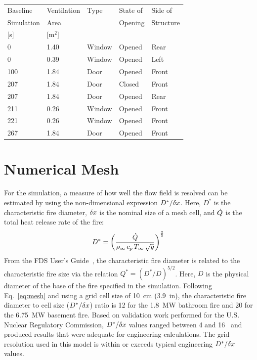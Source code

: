 \documentclass[12pt,oneside]{book}
\begin{document}
\begin{table}
\centering
{}\label{tab:vents}
\begin{tabular}{lllll}
\toprule[1.5pt]
Baseline     &   Ventilation   &  Type       & State of       &  Side of  \\
Simulation  &  Area             &                 & Opening     &  Structure  \\
{[s]}             &  {[m$^2$]}     &                 &           &               \\
\midrule
0               &  1.40             &  Window      &  Opened     &  Rear  \\[.25cm]
0               &  0.39             &  Window      &  Opened     &  Left  \\[.25cm]
100             &  1.84             &  Door        &  Opened     &  Front \\[.25cm]
207             &  1.84             &  Door        &  Closed     &  Front \\[.25cm]
207             &  1.84             &  Door        &  Opened     &  Rear  \\[.25cm]
211             &  0.26             &  Window      &  Opened     &  Front \\[.25cm]
221             &  0.26             &  Window      &  Opened     &  Front \\[.25cm]
267             &  1.84             &  Door        &  Opened     &  Front \\[.25cm]

\bottomrule[1.25pt]
\end{tabular}\par
\footnotesize
\normalsize
\end{table}

\section{Numerical Mesh}
\label{mesh}
For the simulation, a measure of how well the flow field is resolved can be estimated by using the non-dimensional expression $D^*/\delta x$. Here, $D^*$ is the characteristic fire diameter, $\delta x$ is the nominal size of a mesh cell, and $\dot{Q}$ is the total heat release rate of the fire:
\begin{equation}
D^* = \left(
     \frac{\dot{Q}}{\rho_\infty \, c_p \, T_\infty \, \sqrt{g}}
     \right)^\frac{2}{5} 
\label{eq:mesh}
\end{equation}   
From the FDS User's Guide~\cite{FDS_Users_Guide}, the characteristic fire diameter is related to the characteristic fire size via the relation $Q^* = (D^*/D)^{5/2}$. Here, $D$ is the physical diameter of the base of the fire specified in the simulation. Following Eq.~\ref{eq:mesh} and using a grid cell size of 10~cm (3.9~in), the characteristic fire diameter to cell size ($D^*/\delta x$) ratio is 12 for the 1.8~MW bathroom fire and 20 for the 6.75~MW basement fire. Based on validation work performed for the U.S. Nuclear Regulatory Commission, $D^*/\delta x$ values ranged between 4 and 16~\cite{NUREG_1824} and produced results that were adequate for engineering calculations. The grid resolution used in this model is within or exceeds typical engineering $D^*/\delta x$ values.
\end{document}
